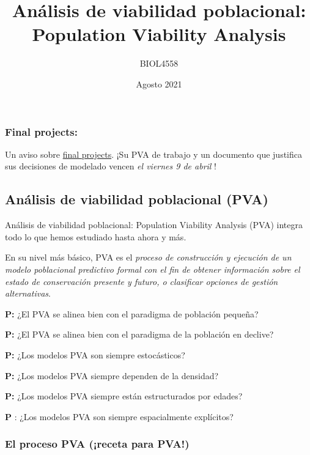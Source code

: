\documentclass[
]{article}
\title{Análisis de viabilidad poblacional: Population Viability
Analysis}
\author{BIOL4558}
\date{Agosto 2021}
\begin{document}
\maketitle

{
\setcounter{tocdepth}{2}
\tableofcontents
}
\hypertarget{final-projects}{%
\subsubsection{Final projects:}\label{final-projects}}

Un aviso sobre \href{FINAL_PROJECTS.html}{final projects}. ¡Su PVA de
trabajo y un documento que justifica sus decisiones de modelado vencen
\emph{el viernes 9 de abril }!

\hypertarget{anuxe1lisis-de-viabilidad-poblacional-pva}{%
\subsection{Análisis de viabilidad poblacional
(PVA)}\label{anuxe1lisis-de-viabilidad-poblacional-pva}}

Análisis de viabilidad poblacional: Population Viability Analysis (PVA)
integra todo lo que hemos estudiado hasta ahora y más.

En su nivel más básico, PVA es el \emph{proceso de construcción y
ejecución de un modelo poblacional predictivo formal con el fin de
obtener información sobre el estado de conservación presente y futuro, o
clasificar opciones de gestión alternativas}.

\textbf{P: } ¿El PVA se alinea bien con el paradigma de población
pequeña?

\textbf{P: } ¿El PVA se alinea bien con el paradigma de la población en
declive?

\textbf{P: } ¿Los modelos PVA son siempre estocásticos?

\textbf{P: } ¿Los modelos PVA siempre dependen de la densidad?

\textbf{P: } ¿Los modelos PVA siempre están estructurados por edades?

\textbf{P }: ¿Los modelos PVA son siempre espacialmente explícitos?

\hypertarget{el-proceso-pva-receta-para-pva}{%
\subsubsection{El proceso PVA (¡receta para
PVA!)}\label{el-proceso-pva-receta-para-pva}}
\end{document}
